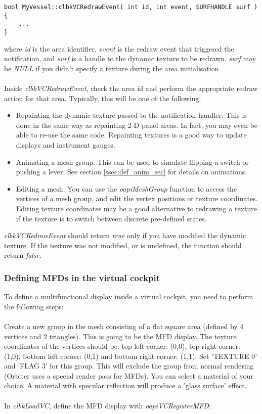 \documentclass[Orbiter Developer Manual.tex]{subfiles}
\begin{document}
\begin{lstlisting}
bool MyVessel::clbkVCRedrawEvent( int id, int event, SURFHANDLE surf )
{
	...
}
\end{lstlisting}

\noindent
where \textit{id} is the area identifier, \textit{event} is the redraw event that triggered the notification, and \textit{surf} is a handle to the dynamic texture to be redrawn. \textit{surf} may be \textit{NULL} if you didn't specify a texture during the area initialisation.\\
\\
Inside \textit{clbkVCRedrawEvent}, check the area id and perform the appropriate redraw action for that area. Typically, this will be one of the following:

\begin{itemize}
\item Repainting the dynamic texture passed to the notification handler. This is done in the same way as repainting 2-D panel areas. In fact, you may even be able to re-use the same code. Repainting textures is a good way to update displays and instrument gauges.
\item Animating a mesh group. This can be used to simulate flipping a switch or pushing a lever. See section \ref{ssec:def_anim_sec} for details on animations.
\item Editing a mesh. You can use the \textit{oapiMeshGroup} function to access the vertices of a mesh group, and edit the vertex positions or texture coordinates. Editing texture coordinates may be a good alternative to redrawing a texture if the texture is to switch between discrete pre-defined states.
\end{itemize}

\noindent
\textit{clbkVCRedrawEvent} should return \textit{true} only if you have modified the dynamic texture. If the texture was not modified, or is undefined, the function should return \textit{false}.


\subsubsection{Defining MFDs in the virtual cockpit}
To define a multifunctional display inside a virtual cockpit, you need to perform the following steps:\\
\\
Create a new group in the mesh consisting of a flat square area (defined by 4 vertices and 2 triangles). This is going to be the MFD display. The texture coordinates of the vertices should be: top left corner: (0,0), top right corner: (1,0), bottom left corner: (0,1) and bottom right corner: (1,1). Set 'TEXTURE 0' and 'FLAG 3' for this group. This will exclude the group from normal rendering (Orbiter uses a special render pass for MFDs). You can select a material of your choice. A material with specular reflection will produce a 'glass surface' effect.\\
\\
In \textit{clbkLoadVC}, define the MFD display with \textit{oapiVCRegisterMFD}:
\end{document}
